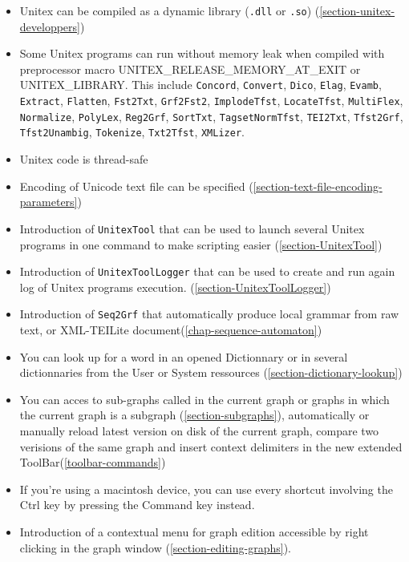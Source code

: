 \begin{itemize}
  \item Unitex can be compiled as a dynamic library (\verb$.dll$ or \verb$.so$)
  (\ref{section-unitex-developpers})
  \item Some Unitex programs can run without memory leak when compiled with preprocessor
  macro UNITEX\_RELEASE\_MEMORY\_AT\_EXIT or UNITEX\_LIBRARY.
  This include \verb$Concord$, \verb$Convert$, \verb$Dico$, \verb$Elag$, \verb$Evamb$, \verb$Extract$, \verb$Flatten$, \verb$Fst2Txt$, \verb$Grf2Fst2$, \verb$ImplodeTfst$, \verb$LocateTfst$, \verb$MultiFlex$, \verb$Normalize$, \verb$PolyLex$, \verb$Reg2Grf$, \verb$SortTxt$, \verb$TagsetNormTfst$, \verb$TEI2Txt$, \verb$Tfst2Grf$, \verb$Tfst2Unambig$, \verb$Tokenize$, \verb$Txt2Tfst$, \verb$XMLizer$.
  \item Unitex code is thread-safe
  \item Encoding of Unicode text file can be specified (\ref{section-text-file-encoding-parameters})
  \item Introduction of \verb$UnitexTool$ that can be used to launch several
  Unitex programs in one command to make scripting easier
  (\ref{section-UnitexTool})
  \item Introduction of \verb$UnitexToolLogger$ that can be used to create and
  run again log of Unitex programs execution.
  (\ref{section-UnitexToolLogger})
  \item Introduction of \verb$Seq2Grf$ that automatically produce local grammar from raw text,
  or XML-TEILite document(\ref{chap-sequence-automaton})
  \item You can look up for a word in an opened Dictionnary or in several dictionnaries from the User or System ressources (\ref{section-dictionary-lookup})
  \item You can acces to sub-graphs called in the current graph or graphs in which the current graph is a subgraph (\ref{section-subgraphs}), automatically or manually reload latest version on disk of the current graph, compare two verisions of the same graph and insert context delimiters in the new extended ToolBar(\ref{toolbar-commands})
  \item If you're using a macintosh device, you can use every shortcut involving the Ctrl key by pressing the Command key instead.
  \item Introduction of a contextual menu for graph edition accessible by right clicking in the graph window (\ref{section-editing-graphs}).

\end{itemize}

